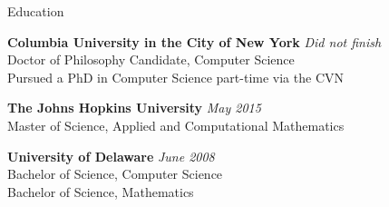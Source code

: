 \documentclass{resume} %
\begin{document}

\begin{rSection}{Education}

{\bf Columbia University in the City of New York} \hfill {\em Did not finish} \\ 
Doctor of Philosophy Candidate, Computer Science \\
Pursued a PhD in Computer Science part-time via the CVN

{\bf The Johns Hopkins University} \hfill {\em May 2015} \\
Master of Science, Applied and Computational Mathematics

{\bf University of Delaware} \hfill {\em June 2008} \\
Bachelor of Science, Computer Science \\
Bachelor of Science, Mathematics \\

\end{rSection}

\end{document}
